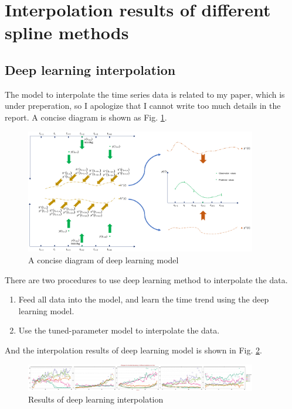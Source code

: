 \documentclass{article}
\begin{document}
\section{Interpolation results of different spline methods}

\subsection{Deep learning interpolation}\label{sec3}

The model to interpolate the time series data is related to my paper, which is under preperation, so I apologize that I cannot write too much details in the report. A concise diagram is shown as Fig. \ref{diagram}.

\begin{figure}[h]
    \centering
    \includegraphics[width=0.9\textwidth]{picture/gruode_model.pdf}
    \caption{A concise diagram of deep learning model}
    \label{diagram}
    \end{figure}

There are two procedures to use deep learning method to interpolate the data.

\begin{enumerate}
    \item Feed all data into the model, and learn the time trend using the deep learning model.
    \item Use the tuned-parameter model to interpolate the data.
\end{enumerate}

And the interpolation results of deep learning model is shown in Fig. \ref{dl}.

\begin{figure}[h]
    \centering
    \includegraphics[width=0.9\textwidth]{figure/DL_spline.pdf}
    \caption{Results of deep learning interpolation}
    \label{dl}
\end{figure}
\end{document}
